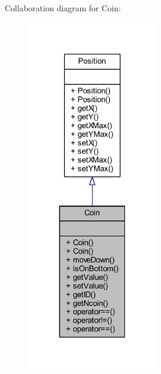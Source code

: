 Collaboration diagram for Coin\+:
\nopagebreak
\begin{figure}[H]
\begin{center}
\leavevmode
\includegraphics[width=163pt]{class_coin__coll__graph}
\end{center}
\end{figure}
